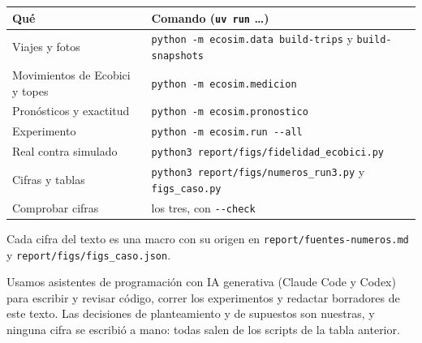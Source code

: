 \documentclass[conference,letterpaper,10pt]{IEEEtran}
\begin{document}
\begin{center}\footnotesize
\begin{tabularx}{\columnwidth}{@{}p{2.7cm}Y@{}}
\toprule
Qué & Comando (\texttt{uv run} \dots) \\
\midrule
Viajes y fotos & \texttt{python -m ecosim.data build-trips} y \texttt{build-snapshots} \\
Movimientos de Ecobici y topes & \texttt{python -m ecosim.medicion} \\
Pronósticos y exactitud & \texttt{python -m ecosim.pronostico} \\
Experimento & \texttt{python -m ecosim.run -{}-all} \\
Real contra simulado & \texttt{python3 report/figs/fidelidad\_ecobici.py} \\
Cifras y tablas & \texttt{python3 report/figs/numeros\_run3.py} y \texttt{figs\_caso.py} \\
Comprobar cifras & los tres, con \texttt{-{}-check} \\
\bottomrule
\end{tabularx}
\end{center}
Cada cifra del texto es una macro con su origen en \texttt{report/fuentes-numeros.md} y \texttt{report/figs/figs\_caso.json}.

Usamos asistentes de programación con IA generativa (Claude Code y Codex) para escribir y revisar código, correr los experimentos y redactar borradores de este texto. Las decisiones de planteamiento y de supuestos son nuestras, y ninguna cifra se escribió a mano: todas salen de los scripts de la tabla anterior.
\end{document}
